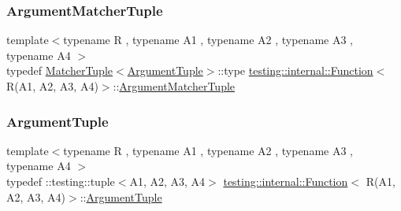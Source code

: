 \mbox{\label{structtesting_1_1internal_1_1_function_3_01_r_07_a1_00_01_a2_00_01_a3_00_01_a4_08_4_a9524b18868ab632a90d4cb6917057a14}} 
\subsubsection{\texorpdfstring{ArgumentMatcherTuple}{ArgumentMatcherTuple}}
{\footnotesize\ttfamily template$<$typename R , typename A1 , typename A2 , typename A3 , typename A4 $>$ \\
typedef \mbox{\hyperlink{structtesting_1_1internal_1_1_matcher_tuple}{Matcher\+Tuple}}$<$\mbox{\hyperlink{structtesting_1_1internal_1_1_function_3_01_r_07_08_4_ad483c3128c470d8cdb55c3ac1c575c11}{Argument\+Tuple}}$>$\+::type \mbox{\hyperlink{structtesting_1_1internal_1_1_function}{testing\+::internal\+::\+Function}}$<$ R(A1, A2, A3, A4)$>$\+::\mbox{\hyperlink{structtesting_1_1internal_1_1_function_3_01_r_07_08_4_a9bec5cf8937e8af99dedab2f40129fab}{Argument\+Matcher\+Tuple}}}

\mbox{\label{structtesting_1_1internal_1_1_function_3_01_r_07_a1_00_01_a2_00_01_a3_00_01_a4_08_4_a8ad9e0ae57a766f80a9816ad45626812}} 
\subsubsection{\texorpdfstring{ArgumentTuple}{ArgumentTuple}}
{\footnotesize\ttfamily template$<$typename R , typename A1 , typename A2 , typename A3 , typename A4 $>$ \\
typedef \+::testing\+::tuple$<$A1, A2, A3, A4$>$ \mbox{\hyperlink{structtesting_1_1internal_1_1_function}{testing\+::internal\+::\+Function}}$<$ R(A1, A2, A3, A4)$>$\+::\mbox{\hyperlink{structtesting_1_1internal_1_1_function_3_01_r_07_08_4_ad483c3128c470d8cdb55c3ac1c575c11}{Argument\+Tuple}}}

